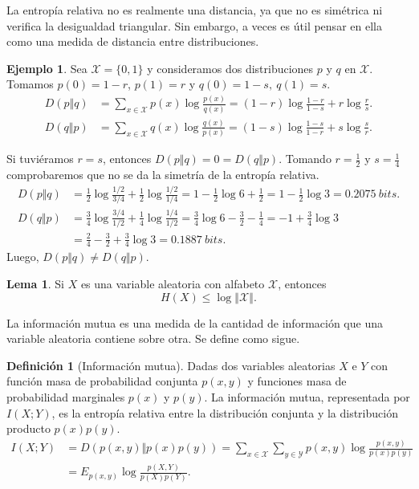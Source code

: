 \documentclass[10pt,a4paper]{article} %
\theoremstyle{definition}
\newtheorem{definition}{Definición}[section]
\newtheorem{lemma}[theorem]{Lema}
\newtheorem{example}[theorem]{Ejemplo}
\begin{document}
La entropía relativa no es realmente una distancia, ya que no es simétrica ni verifica la desigualdad triangular. Sin embargo, a veces es útil pensar en ella como una medida de distancia entre distribuciones.

\begin{example}
  Sea $\mathcal{X} = \{0,1\}$ y consideramos dos distribuciones $p$ y $q$ en $\mathcal{X}$. Tomamos $p(0) = 1-r$, $p(1) = r$ y $q(0) = 1-s,\ q(1) = s$.
  \begin{align*}
    D(p \Vert q) &= \sum_{x \in \mathcal{X}} p(x) \log \frac{p(x)}{q(x)} = (1 - r) \log \frac{1-r}{1-s} + r \log \frac{r}{s}.\\
    D(q \Vert p) &= \sum_{x \in \mathcal{X}}q(x) \log \frac{q(x)}{p(x)} = (1-s) \log \frac{1-s}{1-r} + s \log \frac{s}{r}.
  \end{align*}

  Si tuviéramos $r=s$, entonces $D(p \Vert q) = 0 = D(q \Vert p)$.
  Tomando $r = \frac{1}{2}$ y $s = \frac{1}{4}$ comprobaremos que no se da la simetría de la entropía relativa.
  \begin{align*}
    D(p \Vert q) &= \frac{1}{2} \log \frac{1/2}{3/4} + \frac{1}{2} \log \frac{1/2}{1/4} = 1 - \frac{1}{2} \log 6 + \frac{1}{2} = 1 - \frac{1}{2} \log 3 = 0.2075\ bits.\\
    D(q \Vert p) &= \frac{3}{4} \log \frac{3/4}{1/2} + \frac{1}{4} \log \frac{1/4}{1/2} = \frac{3}{4} \log 6 - \frac{3}{2} - \frac{1}{4} = -1 + \frac{3}{4} \log 3 \\&= \frac{2}{4} - \frac{3}{2} + \frac{3}{4} \log 3 = 0.1887\ bits. %
  \end{align*}
Luego, $D(p\Vert q) \ne D(q \Vert p)$.
\end{example}

\begin{lemma}
  Si $X$ es una variable aleatoria con alfabeto $\mathcal{X}$, entonces \[
  H(X) \leq \log{\left\Vert\mathcal{X}\right\Vert}. 
  \]
\end{lemma}
  

La información mutua es una medida de la cantidad de información que una variable aleatoria contiene sobre otra. Se define como sigue.

\begin{definition}[Información mutua]
  Dadas dos variables aleatorias $X$ e $Y$ con función masa de probabilidad conjunta $p(x,y)$ y funciones masa de probabilidad marginales $p(x)$ y $p(y)$. La información mutua, representada por $I(X;Y)$, es la entropía relativa entre la distribución conjunta y la distribución producto $p(x)p(y)$.
  \begin{align*}
  I(X;Y) &= D \left ( p(x,y) \Vert p(x)p(y) \right ) = \sum_{x \in \mathcal{X}}\sum_{y \in \mathcal{Y}} p(x,y) \log \frac{p(x,y)}{p(x)p(y)}\\ &= E_{p(x,y)} \log \frac{p(X,Y)}{p(X)p(Y)}.
  \end{align*}
\end{definition}
\end{document}
